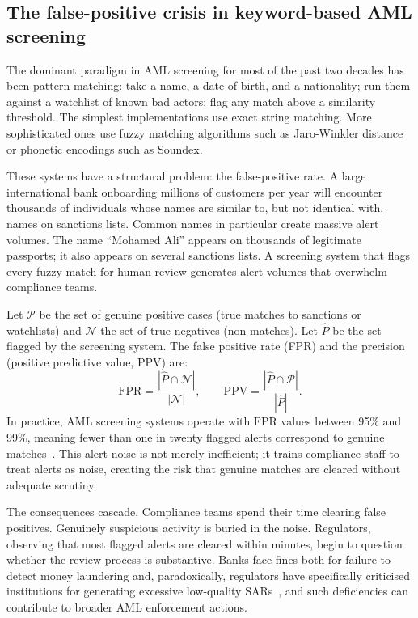 \subsection{The false-positive crisis in keyword-based AML screening}
\label{sec:ch11-false-positive-crisis}

The dominant paradigm in AML screening for most of the past two decades has been pattern matching: take a name, a date of birth, and a nationality; run them against a watchlist of known bad actors; flag any match above a similarity threshold. The simplest implementations use exact string matching. More sophisticated ones use fuzzy matching algorithms such as Jaro-Winkler distance or phonetic encodings such as Soundex.

These systems have a structural problem: the false-positive rate. A large international bank onboarding millions of customers per year will encounter thousands of individuals whose names are similar to, but not identical with, names on sanctions lists. Common names in particular create massive alert volumes. The name ``Mohamed Ali'' appears on thousands of legitimate passports; it also appears on several sanctions lists. A screening system that flags every fuzzy match for human review generates alert volumes that overwhelm compliance teams.

\begin{definition}
\label{def:fp-rate-aml}
Let $\mathcal{P}$ be the set of genuine positive cases (true matches to sanctions or watchlists) and $\mathcal{N}$ the set of true negatives (non-matches). Let $\hat{P}$ be the set flagged by the screening system. The false positive rate (FPR) and the precision (positive predictive value, PPV) are:
\begin{equation}
\label{eq:fpr-aml}
\mathrm{FPR} = \frac{|\hat{P} \cap \mathcal{N}|}{|\mathcal{N}|}, \qquad \mathrm{PPV} = \frac{|\hat{P} \cap \mathcal{P}|}{|\hat{P}|}.
\end{equation}
In practice, AML screening systems operate with $\mathrm{FPR}$ values between 95\% and 99\%, meaning fewer than one in twenty flagged alerts correspond to genuine matches~\cite{fincen2020aml}. This alert noise is not merely inefficient; it trains compliance staff to treat alerts as noise, creating the risk that genuine matches are cleared without adequate scrutiny.
\end{definition}

The consequences cascade. Compliance teams spend their time clearing false positives. Genuinely suspicious activity is buried in the noise. Regulators, observing that most flagged alerts are cleared within minutes, begin to question whether the review process is substantive. Banks face fines both for failure to detect money laundering and, paradoxically, regulators have specifically criticised institutions for generating excessive low-quality SARs~\cite{fincen2020aml}, and such deficiencies can contribute to broader AML enforcement actions.

